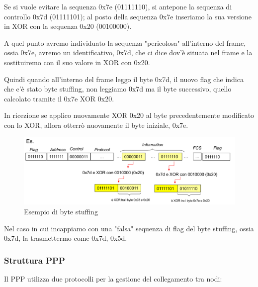     Se si vuole evitare la sequenza 0x7e (01111110), si antepone la sequenza di controllo 0x7d (01111101); al posto della sequenza 0x7e inseriamo la sua versione in XOR con la sequenza 0x20 (00100000).
    
    A quel punto avremo individuato la sequenza "pericolosa" all'interno del frame, ossia 0x7e, avremo un identificativo, 0x7d, che ci dice dov'è situata nel frame e la sostituiremo con il suo valore in XOR con 0x20.
     
    Quindi quando all'interno del frame leggo il byte 0x7d, il nuovo flag che indica che c'è stato byte stuffing, non leggiamo 0x7d ma il byte successivo, quello calcolato tramite il 0x7e XOR 0x20.

    In ricezione se applico nuovamente XOR 0x20 al byte precedentemente modificato con lo XOR, allora otterrò nuovamente il byte iniziale, 0x7e.
    
    
    
    \begin{figure}[htbp]
        \centering
        \includegraphics[width=1\textwidth]{images/bytestuffing.png}
        \caption{Esempio di byte stuffing}
        \label{fig:byte-stuffing}
    \end{figure}

    Nel caso in cui incappiamo con una "falsa" sequenza di flag del byte stuffing, ossia 0x7d, la trasmettermo come 0x7d, 0x5d.
     
    \subsubsection{Struttura PPP}

    Il PPP utilizza due protocolli per la gestione del collegamento tra nodi:
    
